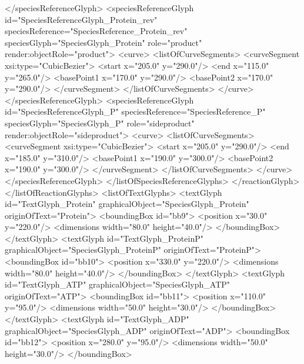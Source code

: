 {\begin{example}
        </speciesReferenceGlyph>
        <speciesReferenceGlyph id="SpeciesReferenceGlyph_Protein_rev"
                        speciesReference="SpeciesReference_Protein_rev" 
                        speciesGlyph="SpeciesGlyph_Protein" role="product" 
                        render:objectRole="product">
         <curve>
          <listOfCurveSegments>
           <curveSegment xsi:type="CubicBezier">
            <start x="205.0" y="290.0"/>
            <end x="115.0" y="265.0"/>
            <basePoint1 x="170.0" y="290.0"/>
            <basePoint2 x="170.0" y="290.0"/>
           </curveSegment>
          </listOfCurveSegments>
         </curve>
        </speciesReferenceGlyph>
        <speciesReferenceGlyph id="SpeciesReferenceGlyph_P"
                        speciesReference="SpeciesReference_P"
                        speciesGlyph="SpeciesGlyph_P"
                        role="sideproduct" 
                        render:objectRole="sideproduct">
         <curve>
          <listOfCurveSegments>
           <curveSegment xsi:type="CubicBezier">
            <start x="205.0" y="290.0"/>
            <end x="185.0" y="310.0"/>
            <basePoint1 x="190.0" y="300.0"/>
            <basePoint2 x="190.0" y="300.0"/>
           </curveSegment>
          </listOfCurveSegments>
         </curve>
        </speciesReferenceGlyph>
       </listOfSpeciesReferenceGlyphs>
      </reactionGlyph>
     </listOfReactionGlyphs>
     <listOfTextGlyphs>
      <textGlyph id="TextGlyph_Protein" 
                 graphicalObject="SpeciesGlyph_Protein" 
                 originOfText="Protein">
       <boundingBox id="bb9">
        <position x="30.0" y="220.0"/>
        <dimensions width="80.0" height="40.0"/>
       </boundingBox>
      </textGlyph>
      <textGlyph id="TextGlyph_ProteinP" 
                 graphicalObject="SpeciesGlyph_ProteinP" 
                 originOfText="ProteinP">
       <boundingBox id="bb10">
        <position x="330.0" y="220.0"/>
        <dimensions width="80.0" height="40.0"/>
       </boundingBox>
      </textGlyph>
      <textGlyph id="TextGlyph_ATP" 
                 graphicalObject="SpeciesGlyph_ATP"
                 originOfText="ATP">
       <boundingBox id="bb11">
        <position x="110.0" y="95.0"/>
        <dimensions width="50.0" height="30.0"/>
       </boundingBox>
      </textGlyph>
      <textGlyph id="TextGlyph_ADP" 
                 graphicalObject="SpeciesGlyph_ADP"
                 originOfText="ADP">
       <boundingBox id="bb12">
        <position x="280.0" y="95.0"/>
        <dimensions width="50.0" height="30.0"/>
       </boundingBox>

\end{example}}
